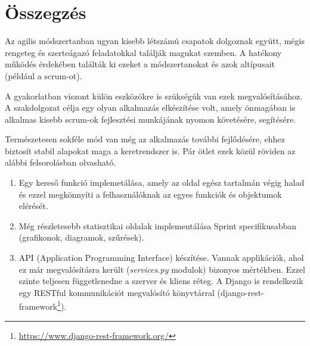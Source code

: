 \chapter{Összegzés} %
\label{ch:sum}

Az agilis módszertanban ugyan kisebb létszámú csapatok dolgoznak együtt, mégis rengeteg és szerteágazó feladatokkal találják magukat szemben. A hatékony működés érdekében találták ki ezeket a módszertanokat és azok altípusait (például a scrum-ot). 

A gyakorlatban viszont külön eszközökre is szükségük van ezek megvalósításához. A szakdolgozat célja egy olyan alkalmazás elkészítése volt, amely önmagában is alkalmas kisebb scrum-ok fejlesztési munkájának nyomon követésére, segítésére. 

Természetesen sokféle mód van még az alkalmazás további fejlődésére, ehhez biztosít stabil alapokat maga a keretrendszer is. Pár ötlet ezek közül röviden az alábbi felsorolásban olvasható.

\begin{enumerate}
    \item Egy kereső funkció implemetálása, amely az oldal egész tartalmán végig halad és ezzel megkönnyíti a felhasználóknak az egyes funkciók és objektumok elérését.
    \item Még részletesebb statisztikai oldalak implementálása Sprint specifikusabban (grafikonok, diagramok, szűrések).
    \item API (Application Programming Interface) készítése. Vannak applikációk, ahol ez már megvalósításra került (\textit{services.py} modulok) bizonyos mértékben. Ezzel szinte teljesen függetlenedne a szerver és kliens réteg.
    A Django is rendelkezik egy RESTful kommunikációt megvalósító könyvtárral (django-rest-framework\footnote{\url{https://www.django-rest-framework.org/}}).
\end{enumerate}




